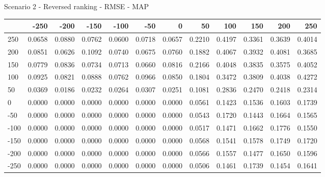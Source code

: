 Scenario 2 - Reversed ranking - RMSE - MAP
\begin{tabular}{lrrrrrrrrrrr}
\toprule
{} &   -250 &   -200 &   -150 &   -100 &   -50  &    0   &    50  &    100 &    150 &    200 &    250 \\
\midrule
 250 & 0.0658 & 0.0880 & 0.0762 & 0.0600 & 0.0718 & 0.0657 & 0.2210 & 0.4197 & 0.3361 & 0.3639 & 0.4014 \\
 200 & 0.0851 & 0.0626 & 0.1092 & 0.0740 & 0.0675 & 0.0760 & 0.1882 & 0.4067 & 0.3932 & 0.4081 & 0.3685 \\
 150 & 0.0779 & 0.0836 & 0.0734 & 0.0713 & 0.0660 & 0.0816 & 0.2166 & 0.4048 & 0.3835 & 0.3575 & 0.4052 \\
 100 & 0.0925 & 0.0821 & 0.0888 & 0.0762 & 0.0966 & 0.0850 & 0.1804 & 0.3472 & 0.3809 & 0.4038 & 0.4272 \\
 50  & 0.0369 & 0.0186 & 0.0232 & 0.0264 & 0.0307 & 0.0251 & 0.1081 & 0.2836 & 0.2470 & 0.2418 & 0.2314 \\
 0   & 0.0000 & 0.0000 & 0.0000 & 0.0000 & 0.0000 & 0.0000 & 0.0561 & 0.1423 & 0.1536 & 0.1603 & 0.1739 \\
-50  & 0.0000 & 0.0000 & 0.0000 & 0.0000 & 0.0000 & 0.0000 & 0.0543 & 0.1720 & 0.1443 & 0.1664 & 0.1565 \\
-100 & 0.0000 & 0.0000 & 0.0000 & 0.0000 & 0.0000 & 0.0000 & 0.0517 & 0.1471 & 0.1662 & 0.1776 & 0.1550 \\
-150 & 0.0000 & 0.0000 & 0.0000 & 0.0000 & 0.0000 & 0.0000 & 0.0568 & 0.1541 & 0.1578 & 0.1749 & 0.1720 \\
-200 & 0.0000 & 0.0000 & 0.0000 & 0.0000 & 0.0000 & 0.0000 & 0.0566 & 0.1557 & 0.1477 & 0.1650 & 0.1596 \\
-250 & 0.0000 & 0.0000 & 0.0000 & 0.0000 & 0.0000 & 0.0000 & 0.0506 & 0.1461 & 0.1739 & 0.1454 & 0.1641 \\
\bottomrule
\end{tabular}

